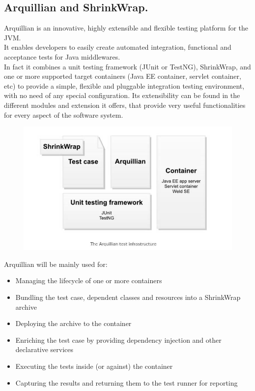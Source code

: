 \documentclass[18pt,oneside,a4paper, titlepage]{article}
\begin{document}
	\subsection{Arquillian and ShrinkWrap.}
		Arquillian is an innovative, highly extensible and flexible testing platform for the JVM.\\ It enables developers to easily create automated integration, functional and acceptance tests for Java middlewares. \\In fact it combines a unit testing framework (JUnit or TestNG), ShrinkWrap, and one or more supported target containers (Java EE container, servlet container, etc) to provide a simple, flexible and pluggable integration testing environment, with no need of any special configuration.
	\newpage
	\noindent
		Its extensibility can be found in the different modules and extension it offers, that provide very useful functionalities for every aspect of the software system.
		\vspace{0.5cm}
		\begin{figure}[h]
			\centering
			\includegraphics[scale=0.45]{Arquillian.jpg}
		\end{figure}
			
		\vspace{0.5cm}
	
		Arquillian will be mainly used for:
		\begin{itemize}
			\item Managing the lifecycle of one or more containers
			\item Bundling the test case, dependent classes and resources into a ShrinkWrap archive
			\item Deploying the archive to the container
			\item Enriching the test case by providing dependency injection and other declarative services
			\item Executing the tests inside (or against) the container
			\item Capturing the results and returning them to the test runner for reporting
		\end{itemize}
		
\end{document}
